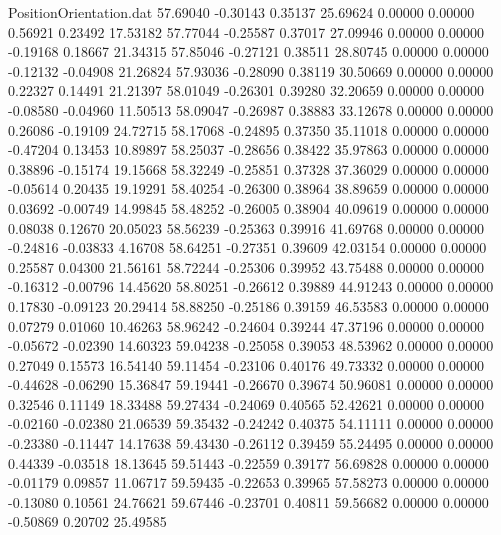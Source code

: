 \begin{filecontents}{PositionOrientation.dat}
  57.69040   -0.30143    0.35137    25.69624    0.00000    0.00000    0.56921    0.23492   17.53182
  57.77044   -0.25587    0.37017    27.09946    0.00000    0.00000   -0.19168    0.18667   21.34315
  57.85046   -0.27121    0.38511    28.80745    0.00000    0.00000   -0.12132   -0.04908   21.26824
  57.93036   -0.28090    0.38119    30.50669    0.00000    0.00000    0.22327    0.14491   21.21397
  58.01049   -0.26301    0.39280    32.20659    0.00000    0.00000   -0.08580   -0.04960   11.50513
  58.09047   -0.26987    0.38883    33.12678    0.00000    0.00000    0.26086   -0.19109   24.72715
  58.17068   -0.24895    0.37350    35.11018    0.00000    0.00000   -0.47204    0.13453   10.89897
  58.25037   -0.28656    0.38422    35.97863    0.00000    0.00000    0.38896   -0.15174   19.15668
  58.32249   -0.25851    0.37328    37.36029    0.00000    0.00000   -0.05614    0.20435   19.19291
  58.40254   -0.26300    0.38964    38.89659    0.00000    0.00000    0.03692   -0.00749   14.99845
  58.48252   -0.26005    0.38904    40.09619    0.00000    0.00000    0.08038    0.12670   20.05023
  58.56239   -0.25363    0.39916    41.69768    0.00000    0.00000   -0.24816   -0.03833    4.16708
  58.64251   -0.27351    0.39609    42.03154    0.00000    0.00000    0.25587    0.04300   21.56161
  58.72244   -0.25306    0.39952    43.75488    0.00000    0.00000   -0.16312   -0.00796   14.45620
  58.80251   -0.26612    0.39889    44.91243    0.00000    0.00000    0.17830   -0.09123   20.29414
  58.88250   -0.25186    0.39159    46.53583    0.00000    0.00000    0.07279    0.01060   10.46263
  58.96242   -0.24604    0.39244    47.37196    0.00000    0.00000   -0.05672   -0.02390   14.60323
  59.04238   -0.25058    0.39053    48.53962    0.00000    0.00000    0.27049    0.15573   16.54140
  59.11454   -0.23106    0.40176    49.73332    0.00000    0.00000   -0.44628   -0.06290   15.36847
  59.19441   -0.26670    0.39674    50.96081    0.00000    0.00000    0.32546    0.11149   18.33488
  59.27434   -0.24069    0.40565    52.42621    0.00000    0.00000   -0.02160   -0.02380   21.06539
  59.35432   -0.24242    0.40375    54.11111    0.00000    0.00000   -0.23380   -0.11447   14.17638
  59.43430   -0.26112    0.39459    55.24495    0.00000    0.00000    0.44339   -0.03518   18.13645
  59.51443   -0.22559    0.39177    56.69828    0.00000    0.00000   -0.01179    0.09857   11.06717
  59.59435   -0.22653    0.39965    57.58273    0.00000    0.00000   -0.13080    0.10561   24.76621
  59.67446   -0.23701    0.40811    59.56682    0.00000    0.00000   -0.50869    0.20702   25.49585

\end{filecontents}
